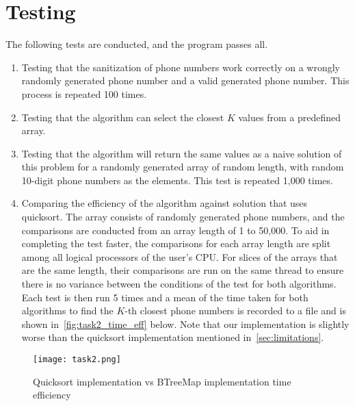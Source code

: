 \documentclass{report}
\begin{document}
\section{Testing}
The following tests are conducted, and the program passes all.
\begin{enumerate}
	\item Testing that the sanitization of phone numbers work correctly on a wrongly randomly generated phone number and a valid generated phone number. This process is repeated 100 times.
	\item Testing that the algorithm can select the closest \(K\) values from a predefined array.
	\item Testing that the algorithm will return the same values as a naive solution of this problem for a randomly generated array of random length, with random 10-digit phone numbers as the elements. This test is repeated 1,000 times.
	\item Comparing the efficiency of the algorithm against solution that uses quicksort. The array consists of randomly generated phone numbers, and the comparisons are conducted from an array length of 1 to 50,000. To aid in completing the test faster, the comparisons for each array length are split among all logical processors of the user's CPU\@. For slices of the arrays that are the same length, their comparisons are run on the same thread to ensure there is no variance between the conditions of the test for both algorithms. Each test is then run 5 times and a mean of the time taken for both algorithms to find the \(K\)-th closest phone numbers is recorded to a file and is shown in~\autoref{fig:task2_time_eff} below. Note that our implementation is slightly worse than the quicksort implementation mentioned in~\autoref{sec:limitations}.
\end{enumerate}
\begin{figure}[H]
	\centering
	\texttt{[image: task2.png]}
	\caption{Quicksort implementation vs BTreeMap implementation time efficiency}
	\label{fig:task2_time_eff}
\end{figure}

\renewcommand{\chaptername}{Chapter}
\setcounter{biburlnumpenalty}{9000}
\printbibliography[heading=bibnumbered]
\end{document}
